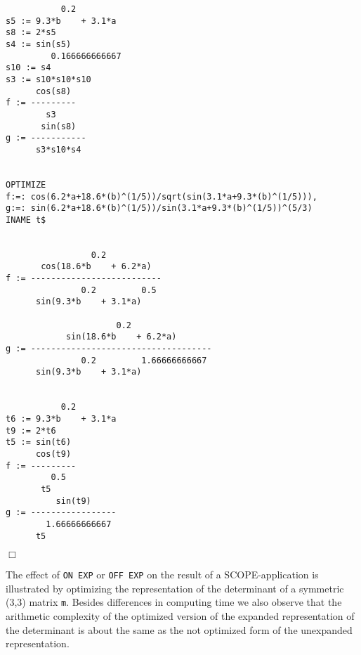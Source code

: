 \newpage
{\small
\begin{verbatim}
           0.2
s5 := 9.3*b    + 3.1*a
s8 := 2*s5
s4 := sin(s5)
         0.166666666667
s10 := s4
s3 := s10*s10*s10
      cos(s8)
f := ---------
        s3
       sin(s8)
g := -----------
      s3*s10*s4


OPTIMIZE
f:=: cos(6.2*a+18.6*(b)^(1/5))/sqrt(sin(3.1*a+9.3*(b)^(1/5))),
g:=: sin(6.2*a+18.6*(b)^(1/5))/sin(3.1*a+9.3*(b)^(1/5))^(5/3)
INAME t$


                 0.2
       cos(18.6*b    + 6.2*a)
f := --------------------------
               0.2         0.5
      sin(9.3*b    + 3.1*a)

                      0.2
            sin(18.6*b    + 6.2*a)
g := ------------------------------------
               0.2         1.66666666667
      sin(9.3*b    + 3.1*a)


           0.2
t6 := 9.3*b    + 3.1*a
t9 := 2*t6
t5 := sin(t6)
      cos(t9)
f := ---------
         0.5
       t5
          sin(t9)
g := -----------------
        1.66666666667
      t5
\end{verbatim}
\begin{flushright}
$\Box$
\end{flushright}}
\newpage
\example\label{ex:3.1.8}

The effect of {\tt ON EXP} or {\tt OFF EXP} on the result of a
SCOPE-application is illustrated by optimi\-zing the representation of the
determinant of a symmetric (3,3) matrix {\tt m}.  Besides differences in
computing time we also observe that the arithmetic complexity of the
optimized version of the expanded representation of the determinant is
about the same as the not optimized form of the unexpanded representation.

